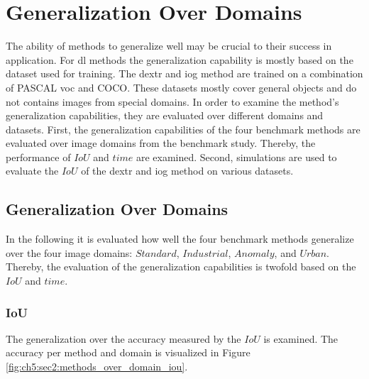 
\section{Generalization Over Domains} \label{ord:ch5:sec2_generalization_image_domains}
The ability of methods to generalize well may be crucial to their success in application.
For \gls{dl} methods the generalization capability is mostly based on the dataset used for training.
The \gls{dextr} and \gls{iog} method are trained on a combination of PASCAL \gls{voc} and COCO.
These datasets mostly cover general objects and do not contains images from special domains.
In order to examine the method's generalization capabilities, they are evaluated over different domains and datasets.
First, the generalization capabilities of the four benchmark methods are evaluated over image domains from the benchmark study.
Thereby, the performance of $ IoU $ and $ time $ are examined.
Second, simulations are used to evaluate the $ IoU $ of the \gls{dextr} and \gls{iog} method on various datasets.

\subsection{Generalization Over Domains}
In the following it is evaluated how well the four benchmark methods generalize over the four image domains: $ Standard $, $ Industrial $, $ Anomaly $, and $ Urban $.
Thereby, the evaluation of the generalization capabilities is twofold based on the $ IoU $ and $ time $.

\subsubsection{IoU}
The generalization over the accuracy measured by the $ IoU $ is examined.
The accuracy per method and domain is visualized in Figure \ref{fig:ch5:sec2:methods_over_domain_iou}.

